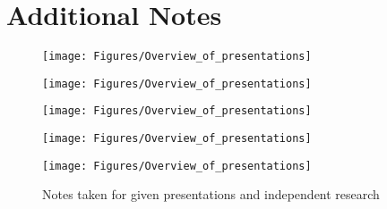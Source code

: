 

\section{Additional Notes} \label{Section:Notes}


	\begin{figure}[ht!]
		\centering
		\texttt{[image: Figures/Overview\_of\_presentations]}		
		\label {fig:additional:notes1}
	\end{figure}
	
		\begin{figure}[ht!]
		\centering
		\texttt{[image: Figures/Overview\_of\_presentations]}		
		\label {fig:additional:notes2}
	\end{figure}
	
		\begin{figure}[ht!]
		\centering
		\texttt{[image: Figures/Overview\_of\_presentations]}		
		\label {fig:additional:notes3}
	\end{figure}
	
		\begin{figure}[ht!]
		\centering
		\texttt{[image: Figures/Overview\_of\_presentations]}		
		\label {fig:additional:notes4}
	\end{figure}
	
		\begin{figure}[ht!]
		\centering
		\texttt{[image: Figures/Overview\_of\_presentations]}		
		\caption[Additional Notes]{Notes taken for given presentations and independent research}
		\label {fig:additional:notes5}
	\end{figure}
